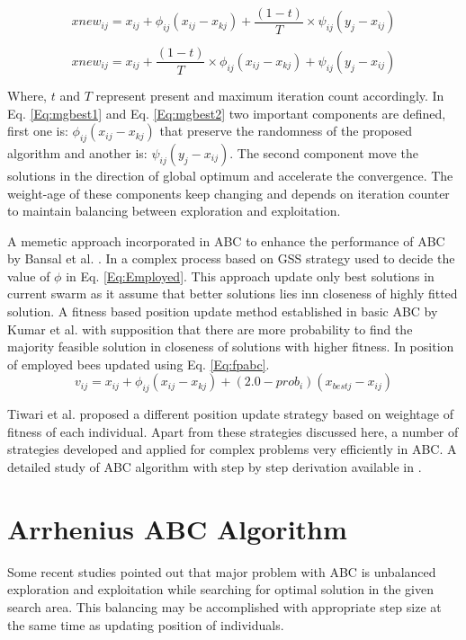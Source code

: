 \documentclass{svproc}
\begin{document}
\begin{equation}\label{Eq:mgbest1}
xnew_{ij}=x_{ij}+\phi_{ij}(x_{ij}-x_{kj})+ \frac{(1-t)}{T}\times \psi_{ij}(y_j-x_{ij})
\end{equation}

\begin{equation}\label{Eq:mgbest2}
xnew_{ij}=x_{ij}+\frac{(1-t)}{T}\times \phi_{ij}(x_{ij}-x_{kj})+ \psi_{ij}(y_j-x_{ij})
\end{equation}

Where, $t$ and $T$ represent present and maximum iteration count accordingly. In Eq. \ref{Eq:mgbest1} and Eq. \ref{Eq:mgbest2} two important components are defined, first one is: $\phi_{ij}(x_{ij}-x_{kj})$ that preserve the randomness of the proposed algorithm and another is: $\psi_{ij}(y_j-x_{ij})$. The second component move the solutions in the direction of global optimum and accelerate the convergence. The weight-age of these components keep changing and depends on iteration counter to maintain balancing between exploration and exploitation.

A memetic approach incorporated in ABC to enhance the performance of ABC by Bansal et al. \cite{bansal2013memetic}. In \cite{bansal2013memetic} a complex process based on GSS strategy used to decide the value of $\phi$  in Eq. \ref{Eq:Employed}. This approach update only best solutions in current swarm as it assume that better solutions lies inn closeness of highly fitted solution. A fitness based position update method established in basic ABC by Kumar et al. \cite{kumar2014fitness} with supposition that there are more probability to find the majority feasible solution in closeness of solutions with higher fitness. In \cite{kumar2014fitness} position of employed bees updated using Eq. \ref{Eq:fpabc}.
\begin{equation}\label{Eq:fpabc}
v_{ij}=x_{ij}+ \phi_{ij}(x_{ij}-x_{kj})+ (2.0-prob_i)(x_{bestj}-x_{ij})
\end{equation}

Tiwari et al. \cite{tiwari2016weight} proposed a different position update strategy based on weightage of fitness of each individual. Apart from these strategies discussed here, a number of strategies developed and applied for complex problems very efficiently in ABC. A detailed study of ABC algorithm with step by step derivation available in \cite{kumar2018artificial}.

\section{Arrhenius ABC Algorithm}\label{sec:aabc}
Some recent studies \cite{bansal2013artificial,kumar2018artificial} pointed out that major problem with ABC is unbalanced exploration and exploitation while searching for optimal solution in the given search area. This balancing may be accomplished with appropriate step size at the same time as updating position of individuals.
\end{document}
